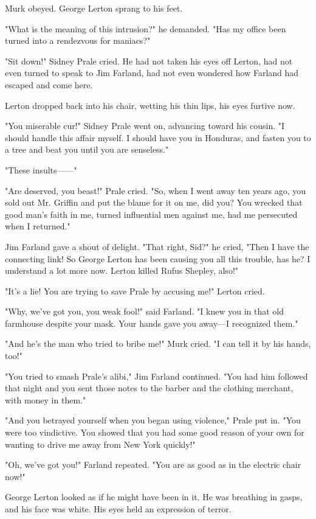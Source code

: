 \documentclass{novel}
\begin{document}
Murk obeyed. George Lerton sprang to his feet.

"What is the meaning of this intrusion?" he demanded. "Has my office been turned into a rendezvous for maniacs?"

"Sit down!" Sidney Prale cried. He had not taken his eyes off Lerton, had not even turned to speak to Jim Farland, had not even wondered how Farland had escaped and come here.

Lerton dropped back into his chair, wetting his thin lips, his eyes furtive now.

"You miserable cur!" Sidney Prale went on, advancing toward his cousin. "I should handle this affair myself. I should have you in Honduras, and fasten you to a tree and beat you until you are senseless."

"These insults------"

"Are deserved, you beast!" Prale cried. "So, when I went away ten years ago, you sold out Mr. Griffin and put the blame for it on me, did you? You wrecked that good man's faith in me, turned influential men against me, had me persecuted when I returned."

Jim Farland gave a shout of delight. "That right, Sid?" he cried, "Then I have the connecting link! So George Lerton has been causing you all this trouble, has he? I understand a lot more now. Lerton killed Rufus Shepley, also!"

"It's a lie! You are trying to save Prale by accusing me!" Lerton cried.

"Why, we've got you, you weak fool!" said Farland. "I knew you in that old farmhouse despite your mask. Your hands gave you away---I recognized them."

"And he's the man who tried to bribe me!" Murk cried. "I can tell it by his hands, too!"

"You tried to smash Prale's alibi," Jim Farland continued. "You had him followed that night and you sent those notes to the barber and the clothing merchant, with money in them."

"And you betrayed yourself when you began using violence," Prale put in. "You were too vindictive. You showed that you had some good reason of your own for wanting to drive me away from New York quickly!"

"Oh, we've got you!" Farland repeated. "You are as good as in the electric chair now!"

George Lerton looked as if he might have been in it. He was breathing in gasps, and his face was white. His eyes held an expression of terror.
\end{document}
